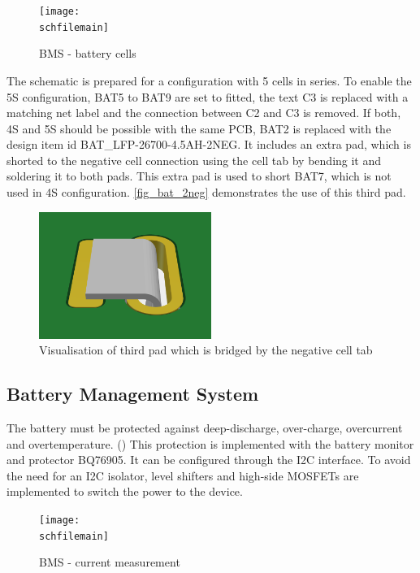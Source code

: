 \begin{figure}[h!]
    \centering
    \texttt{[image: \\schfilemain]}
    \caption{\acs{BMS} - battery cells}
    \label{fig_onoff_switch}
\end{figure}

The schematic is prepared for a configuration with 5 cells in series. To enable the 5S configuration, BAT5 to BAT9 are set to fitted, the text C3 is replaced with a matching net label and the connection between C2 and C3 is removed. If both, 4S and 5S should be possible with the same \ac{PCB}, BAT2 is replaced with the design item id BAT\_LFP-26700-4.5AH-2NEG. It includes an extra pad, which is shorted to the negative cell connection using the cell tab by bending it and soldering it to both pads. This extra pad is used to short BAT7, which is not used in 4S configuration. \autoref{fig_bat_2neg} demonstrates the use of this third pad. 
\begin{figure}[h!]
    \centering
    \includegraphics[width=0.5\textwidth]{img/bat_2neg.png}
    \caption{Visualisation of third pad which is bridged by the negative cell tab}
    \label{fig_bat_2neg}
\end{figure}

\FloatBarrier

\subsection{Battery Management System}
\label{sec_bms}
The battery must be protected against deep-discharge, over-charge, overcurrent and overtemperature. ()
This protection is implemented with the battery monitor and protector BQ76905. It can be configured through the \ac{I2C} interface. To avoid the need for an \ac{I2C} isolator, level shifters and high-side \acp{MOSFET} are implemented to switch the power to the device. 

\begin{figure}[h!]
    \centering
    \texttt{[image: \\schfilemain]}
    \caption{\acs{BMS} - current measurement}
    \label{fig_onoff_switch}
\end{figure}

